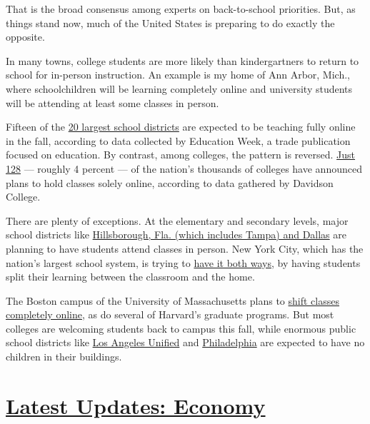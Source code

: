 That is the broad consensus among experts on back-to-school priorities.
But, as things stand now, much of the United States is preparing to do
exactly the opposite.

In many towns, college students are more likely than kindergartners to
return to school for in-person instruction. An example is my home of Ann
Arbor, Mich., where schoolchildren will be learning completely online
and university students will be attending at least some classes in
person.

Fifteen of the
\href{https://www.edweek.org/ew/section/multimedia/school-districts-reopening-plans-a-snapshot.html}{20
largest school districts} are expected to be teaching fully online in
the fall, according to data collected by Education Week, a trade
publication focused on education. By contrast, among colleges, the
pattern is reversed.
\href{https://collegecrisis.shinyapps.io/dashboard/}{Just 128} ---
roughly 4 percent --- of the nation's thousands of colleges have
announced plans to hold classes solely online, according to data
gathered by Davidson College.

There are plenty of exceptions. At the elementary and secondary levels,
major school districts like
\href{https://www.edweek.org/ew/section/multimedia/school-districts-reopening-plans-a-snapshot.html}{Hillsborough,
Fla. (which includes Tampa) and Dallas} are planning to have students
attend classes in person. New York City, which has the nation's largest
school system, is trying to
\href{https://www.schools.nyc.gov/school-year-20-21/return-to-school-2020/welcome-to-the-2020-2021-school-year}{have
it both ways}, by having students split their learning between the
classroom and the home.

The Boston campus of the University of Massachusetts plans to
\href{https://www.masslive.com/news/2020/07/here-are-the-fall-reopening-plans-for-the-25-largest-colleges-in-mass.html}{shift
classes completely online}, as do several of Harvard's graduate
programs. But most colleges are welcoming students back to campus this
fall, while enormous public school districts like
\href{https://achieve.lausd.net/site/default.aspx?PageType=3\&DomainID=4\&ModuleInstanceID=4466\&ViewID=6446EE88-D30C-497E-9316-3F8874B3E108\&RenderLoc=0\&FlexDataID=91406\&PageID=1}{Los
Angeles Unified} and
\href{https://www.philasd.org/coronavirus/schoolstart2020/}{Philadelphia}
are expected to have no children in their buildings.

\hypertarget{latest-updates-economy}{%
\section{\texorpdfstring{\href{https://www.nytimes.com/live/2020/08/03/business/stock-market-today-coronavirus?action=click\&pgtype=Article\&state=default\&region=MAIN_CONTENT_1\&context=storylines_live_updates}{Latest
Updates:
Economy}}{Latest Updates: Economy}}\label{latest-updates-economy}}

